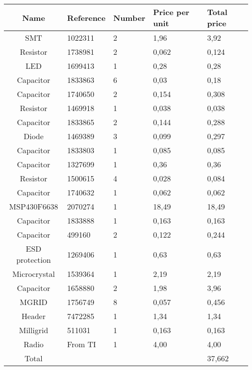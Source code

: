 \begin{tabular}{| c |l | l | l | l |} 
	\hline
		Name & Reference & Number & Price per unit & Total price\\ \hline
		SMT & 1022311 & 2 & 1,96 & 3,92\\ \hline
		Resistor & 1738981 & 2 & 0,062 & 0,124\\ \hline
		LED & 1699413 & 1 & 0,28 & 0,28\\ \hline
		Capacitor & 1833863 & 6 & 0,03 & 0,18\\ \hline
		Capacitor & 1740650 & 2 & 0,154 & 0,308\\ \hline
		Resistor & 1469918 & 1 & 0,038 & 0,038\\ \hline
		Capacitor & 1833865 & 2 & 0,144 & 0,288\\ \hline
		Diode & 1469389 & 3 & 0,099 & 0,297\\ \hline
	   	Capacitor & 1833803 & 1 & 0,085 & 0,085\\ \hline
 		Capacitor & 1327699 & 1 & 0,36 & 0,36 \\ \hline
  		Resistor & 1500615 & 4 & 0,028 & 0,084\\ \hline
	 	Capacitor & 1740632 & 1 & 0,062 & 0,062\\ \hline
	 	MSP430F6638 & 2070274 & 1 & 18,49 & 18,49\\ \hline
	 	Capacitor & 1833888 & 1 & 0,163 & 0,163\\ \hline
	 	Capacitor & 499160 & 2 & 0,122 & 0,244\\ \hline
	 	ESD protection & 1269406 & 1 & 0,63 & 0,63\\ \hline
	 	Microcrystal & 1539364 & 1 & 2,19 & 2,19\\ \hline
	 	Capacitor & 1658880 & 2 & 1,98 & 3,96\\ \hline
	 	MGRID & 1756749 & 8 & 0,057 & 0,456\\ \hline
	 	Header & 7472285 & 1 & 1,34 & 1,34\\ \hline
	 	Milligrid & 511031 & 1 & 0,163 & 0,163\\ \hline
	 	Radio & From TI & 1 & 4,00 & 4,00\\ \hline
	 	Total &  &  &  & 37,662\\ \hline
	\hline
\end{tabular}\\\\
















